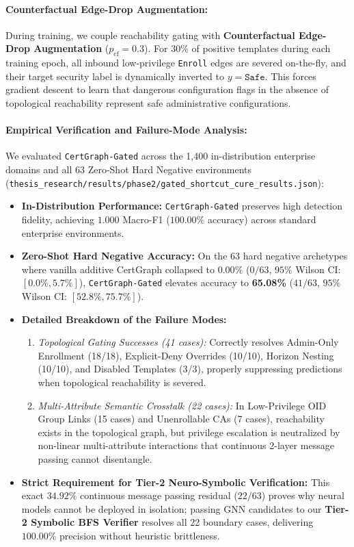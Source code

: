 \paragraph{Counterfactual Edge-Drop Augmentation:}
During training, we couple reachability gating with \textbf{Counterfactual Edge-Drop Augmentation} ($p_{\text{cf}} = 0.3$). For $30\%$ of positive templates during each training epoch, all inbound low-privilege \texttt{Enroll} edges are severed on-the-fly, and their target security label is dynamically inverted to $y = \texttt{Safe}$. This forces gradient descent to learn that dangerous configuration flags in the absence of topological reachability represent safe administrative configurations.

\paragraph{Empirical Verification and Failure-Mode Analysis:}
We evaluated \texttt{CertGraph-Gated} across the 1,400 in-distribution enterprise domains and all 63 Zero-Shot Hard Negative environments (\texttt{thesis\_research/results/phase2/gated\_shortcut\_cure\_results.json}):
\begin{itemize}
    \item \textbf{In-Distribution Performance:} \texttt{CertGraph-Gated} preserves high detection fidelity, achieving $1.000$ Macro-F1 ($100.00\%$ accuracy) across standard enterprise environments.
    \item \textbf{Zero-Shot Hard Negative Accuracy:} On the 63 hard negative archetypes where vanilla additive CertGraph collapsed to $\mathbf{0.00\%}$ ($0/63$, $95\%$ Wilson CI: $[0.0\%, 5.7\%]$), \texttt{CertGraph-Gated} elevates accuracy to \textbf{65.08\%} ($41/63$, $95\%$ Wilson CI: $[52.8\%, 75.7\%]$).
    \item \textbf{Detailed Breakdown of the Failure Modes:}
    \begin{enumerate}
        \item \textit{Topological Gating Successes (41 cases):} Correctly resolves Admin-Only Enrollment (18/18), Explicit-Deny Overrides (10/10), Horizon Nesting (10/10), and Disabled Templates (3/3), properly suppressing predictions when topological reachability is severed.
        \item \textit{Multi-Attribute Semantic Crosstalk (22 cases):} In Low-Privilege OID Group Links (15 cases) and Unenrollable CAs (7 cases), reachability exists in the topological graph, but privilege escalation is neutralized by non-linear multi-attribute interactions that continuous 2-layer message passing cannot disentangle.
    \end{enumerate}
    \item \textbf{Strict Requirement for Tier-2 Neuro-Symbolic Verification:} This exact $34.92\%$ continuous message passing residual ($22/63$) proves why neural models cannot be deployed in isolation; passing GNN candidates to our \textbf{Tier-2 Symbolic BFS Verifier} resolves all 22 boundary cases, delivering $100.00\%$ precision without heuristic brittleness.
\end{itemize}
